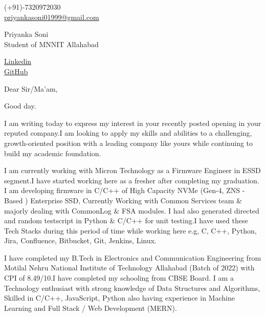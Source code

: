\documentclass[11pt,a4]{article}
\begin{document}
\begin{center}
    \begin{minipage}[b]{0.24\textwidth}
    \large (+91)-7320972030 \\
    \large \href{mailto:priyankasoni01999@gmail.com}{priyankasoni01999@gmail.com} 
\end{minipage} 
\begin{minipage}[b]{0.5\textwidth}
            \centering
            {\Huge Priyanka Soni} \\ %
            \vspace{0.1cm}
            {\color{UI_blue} \Large{Student of MNNIT Allahabad}} \\
    \end{minipage}%
    \begin{minipage}[b]{0.24\textwidth}
            \flushright \large
            {\href{https://www.linkedin.com/in/priyanka-soni-131668176}{Linkedin} } \\
            \href{https://github.com/PSoni8}{GitHub}
    \end{minipage}   
    
\vspace{-0.15cm} 
{\color{UI_blue} \hrulefill}
\end{center}

\justify
\setlength{\parindent}{0pt}
\setlength{\parskip}{12pt}


Dear Sir/Ma'am,

Good day.

I am writing today to express my interest in your recently posted opening in your reputed company.I am looking to apply my skills and abilities to a challenging, growth-oriented position with a leading company like yours while continuing to build my academic foundation.\par

I am currently working with Micron Technology as a Firmware Engineer in ESSD segment.I have started working here as a fresher after completing my graduation. I am developing firmware in C/C++ of High Capacity NVMe (Gen-4, ZNS - Based ) Enterprise SSD, Currently Working with Common Services team \& majorly dealing with CommonLog \& FSA modules. I had also generated directed and random testscript in Python \& C/C++ for unit testing.I have used these Tech Stacks during this period of time while working here e.g, C, C++, Python, Jira, Confluence, Bitbucket, Git, Jenkins, Linux. \par

I have completed my B.Tech in Electronics and Communication Engineering from Motilal Nehru National Institute of Technology Allahabad (Batch of 2022) with CPI of 8.49/10.I have completed my schooling from CBSE Board. I am a Technology enthusiast with strong knowledge of Data Structures and Algorithms, Skilled in C/C++, JavaScript, Python also having experience in Machine Learning and Full Stack / Web Development (MERN).\par
\end{document}
